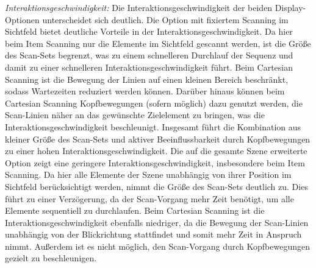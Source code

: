\textit{Interaktionsgeschwindigkeit:}
Die Interaktionsgeschwindigkeit der beiden Display-Optionen unterscheidet sich deutlich. Die Option mit fixiertem Scanning im Sichtfeld bietet deutliche Vorteile in der Interaktionsgeschwindigkeit. Da hier beim Item Scanning nur die Elemente im Sichtfeld gescannt werden, ist die Größe des Scan-Sets begrenzt, was zu einem schnelleren Durchlauf der Sequenz und damit zu einer schnelleren Interaktionsgeschwindigkeit führt. Beim Cartesian Scanning ist die Bewegung der Linien auf einen kleinen Bereich beschränkt, sodass Wartezeiten reduziert werden können. Darüber hinaus können beim Cartesian Scanning Kopfbewegungen (sofern möglich) dazu genutzt werden, die Scan-Linien näher an das gewünschte Zielelement zu bringen, was die Interaktionsgeschwindigkeit beschleunigt. Insgesamt führt die Kombination aus kleiner Größe des Scan-Sets und aktiver Beeinflussbarkeit durch Kopfbewegungen zu einer hohen Interaktionsgeschwindigkeit.
Die auf die gesamte Szene erweiterte Option zeigt eine geringere Interaktionsgeschwindigkeit, insbesondere beim Item Scanning. Da hier alle Elemente der Szene unabhängig von ihrer Position im Sichtfeld berücksichtigt werden, nimmt die Größe des Scan-Sets deutlich zu. Dies führt zu einer Verzögerung, da der Scan-Vorgang mehr Zeit benötigt, um alle Elemente sequentiell zu durchlaufen. Beim Cartesian Scanning ist die Interaktionsgeschwindigkeit ebenfalls niedriger, da die Bewegung der Scan-Linien unabhängig von der Blickrichtung stattfindet und somit mehr Zeit in Anspruch nimmt. Außerdem ist es nicht möglich, den Scan-Vorgang durch Kopfbewegungen gezielt zu beschleunigen. 

